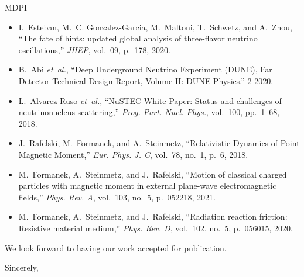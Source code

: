 \documentclass[a4paper, 10pt]{letter}
\begin{document}
\begin{letter}{MDPI}
\begin{itemize}
    \item I.~Esteban, M.~C. Gonzalez-Garcia, M.~Maltoni, T.~Schwetz, and A.~Zhou, ``{The fate of hints: updated global analysis of three-flavor neutrino oscillations},'' {\em JHEP}, vol.~09, p.~178, 2020.
    \item B.~Abi {\em et~al.}, ``{Deep Underground Neutrino Experiment (DUNE), Far Detector Technical Design Report, Volume II: DUNE Physics}.'' 2 2020.
    \item L.~Alvarez-Ruso {\em et~al.}, ``{NuSTEC White Paper: Status and challenges of neutrino\textendash{}nucleus scattering},'' {\em Prog. Part. Nucl. Phys.}, vol.~100, pp.~1--68, 2018.
    \item J.~Rafelski, M.~Formanek, and A.~Steinmetz, ``{Relativistic Dynamics of Point Magnetic Moment},'' {\em Eur. Phys. J. C}, vol.~78, no.~1, p.~6, 2018.
    \item M.~Formanek, A.~Steinmetz, and J.~Rafelski, ``{Motion of classical charged particles with magnetic moment in external plane-wave electromagnetic fields},'' {\em Phys. Rev. A}, vol.~103, no.~5, p.~052218, 2021.
    \item M.~Formanek, A.~Steinmetz, and J.~Rafelski, ``{Radiation reaction friction: Resistive material medium},'' {\em Phys. Rev. D}, vol.~102, no.~5, p.~056015, 2020.
\end{itemize}

We look forward to having our work accepted for publication.

\closing{Sincerely,}

\end{letter}
\end{document}
